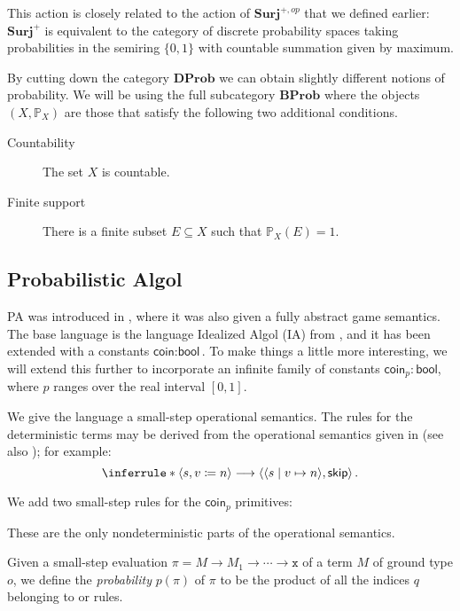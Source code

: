 \documentclass{svproc}
\newcommand*\from{\colon}
\newcommand{\opto}{\longrightarrow}
\newcommand{\x}{{\mathtt{x}}}
\newcommand{\0}{{\mathtt{0}}} \newcommand{\com}{{\mathtt{com}}}
\newcommand{\skipp}{{\mathsf{skip}}}
\newcommand{\ia}[2]{\langle #1 , #2 \rangle}
\newcommand{\stup}[3]{\langle #1 \mid #2 \mapsto #3 \rangle}
\newcommand{\catname}[1]{\mathbf{#1}}
\newcommand{\Surj}{\catname{Surj}}
\newcommand{\DProb}{\catname{DProb}}
\newcommand{\BProb}{\catname{BProb}}
\newcommand{\true}{\mathbbm{t}}
\newcommand{\false}{\mathbbm{f}}
\newcommand{\bP}{\mathbb{P}}
\newcommand{\coin}{\textsf{coin}}
\newcommand{\bool}{\textsf{bool}}
\begin{document}
This action is closely related to the action of $\Surj^{+,op}$ that we defined earlier: $\Surj^+$ is equivalent to the category of discrete probability spaces taking probabilities in the semiring $\{0,1\}$ with countable summation given by maximum.

By cutting down the category $\DProb$ we can obtain slightly different notions of probability.  
We will be using the full subcategory $\BProb$ where the objects $(X,\bP_X)$ are those that satisfy the following two additional conditions.
\begin{description}
  \item[Countability] The set $X$ is countable.
  \item[Finite support] There is a finite subset $E\subseteq X$ such that $\bP_X(E)=1$.
\end{description}

\subsection{Probabilistic Algol}

PA was introduced in \cite{DanosHarmer}, where it was also given a fully abstract game semantics.
The base language is the language Idealized Algol (IA) from \cite{SamsonGuyIAPassive}, and it has been extended with a constants $\coin\from\bool$.  
To make things a little more interesting, we will extend this further to incorporate an infinite family of constants $\coin_p\from\bool$, where $p$ ranges over the real interval $[0,1]$.  

We give the language a small-step operational semantics.  
The rules for the deterministic terms may be derived from the operational semantics given in \cite{SamsonGuyIAPassive} (see also \cite{JimGuySmallStep}); for example:
\[
  \inferrule*{ }{\ia s {v \coloneqq n} \opto \ia {\stup s v n} \skipp}\,.
  \]

We add two small-step rules for the $\coin_p$ primitives:


These are the only nondeterministic parts of the operational semantics.  

Given a small-step evaluation $\pi = M \to M_1 \to \cdots \to \x$ of a term $M$ of ground type $o$, we define the \emph{probability} $p(\pi)$ of $\pi$ to be the product of all the indices $q$ belonging to  or  rules.
\end{document}
